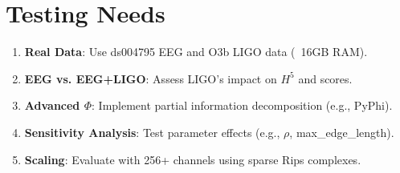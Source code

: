 \documentclass[11pt]{article}
\begin{document}
\section{Testing Needs}
\begin{enumerate}
    \item \textbf{Real Data}: Use ds004795 EEG and O3b LIGO data (~16GB RAM).
    \item \textbf{EEG vs. EEG+LIGO}: Assess LIGO’s impact on $H^5$ and scores.
    \item \textbf{Advanced $\Phi$}: Implement partial information decomposition (e.g., PyPhi).
    \item \textbf{Sensitivity Analysis}: Test parameter effects (e.g., $\rho$, max_edge_length).
    \item \textbf{Scaling}: Evaluate with 256+ channels using sparse Rips complexes.
\end{enumerate}
\end{document}
